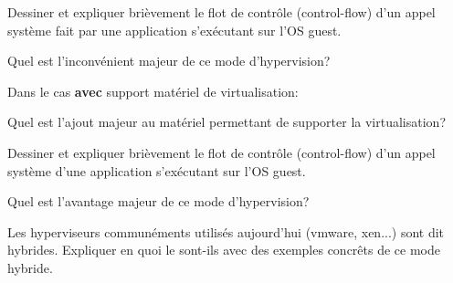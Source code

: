 \begin{questions}
\begin{parts}
\begin{subparts}
\begin{subsubparts}
        \subsubpart[2] Dessiner et expliquer brièvement le flot de contrôle (control-flow) d'un appel système fait par une application s'exécutant sur l'OS guest.

        \subsubpart[1] Quel est l'inconvénient majeur de ce mode d'hypervision?
      \end{subsubparts}

      \subpart Dans le cas \textbf{avec} support matériel de virtualisation:
      \begin{subsubparts}
        \subsubpart[1] Quel est l'ajout majeur au matériel permettant de supporter la virtualisation?

        \subsubpart[2] Dessiner et expliquer brièvement le flot de contrôle (control-flow) d'un appel système d'une application s'exécutant sur l'OS guest.

        \subsubpart[1] Quel est l'avantage majeur de ce mode d'hypervision?

      \end{subsubparts}
  \end{subparts}

  \bonuspart[1] Les hyperviseurs communéments utilisés aujourd'hui (vmware, xen...) sont dit hybrides. Expliquer en quoi le sont-ils avec des exemples concrêts de ce mode hybride.

\end{parts}

\end{questions}

%
%
\gradingtable


